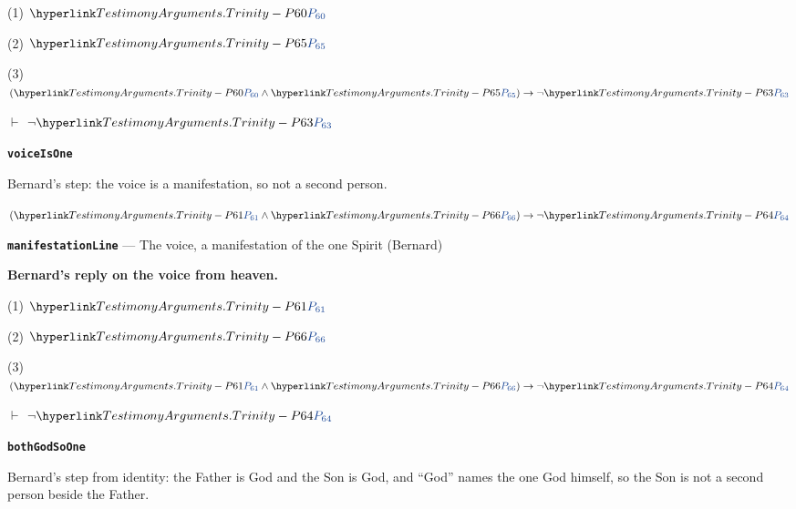 \documentclass[11pt,paper=\testimonypaper,DIV=13,parskip=false]{scrartcl}
\begin{document}
\begin{derivation}
  \item[(1)] \(\pvar{TestimonyArguments.Trinity}{60}\)
  \item[(2)] \(\pvar{TestimonyArguments.Trinity}{65}\)
  \item[(3)] \((\pvar{TestimonyArguments.Trinity}{60} \land \pvar{TestimonyArguments.Trinity}{65}) \rightarrow \lnot \pvar{TestimonyArguments.Trinity}{63}\)
  \item[\(\vdash\)] \(\lnot \pvar{TestimonyArguments.Trinity}{63}\)
\end{derivation}
\par\medskip\noindent\textbf{\texttt{voice\allowbreak{}Is\allowbreak{}One}}\par\nobreak\noindent
Bernard’s step: the voice is a manifestation, so not a second person.

\begin{derivation}
  \item[] \((\pvar{TestimonyArguments.Trinity}{61} \land \pvar{TestimonyArguments.Trinity}{66}) \rightarrow \lnot \pvar{TestimonyArguments.Trinity}{64}\)
\end{derivation}
\par\medskip\noindent\textbf{\texttt{manifestation\allowbreak{}Line}} --- The voice, a manifestation of the one Spirit (Bernard)\par\nobreak\noindent
\textbf{Bernard’s reply on the voice from heaven.}

\begin{derivation}
  \item[(1)] \(\pvar{TestimonyArguments.Trinity}{61}\)
  \item[(2)] \(\pvar{TestimonyArguments.Trinity}{66}\)
  \item[(3)] \((\pvar{TestimonyArguments.Trinity}{61} \land \pvar{TestimonyArguments.Trinity}{66}) \rightarrow \lnot \pvar{TestimonyArguments.Trinity}{64}\)
  \item[\(\vdash\)] \(\lnot \pvar{TestimonyArguments.Trinity}{64}\)
\end{derivation}
\par\medskip\noindent\textbf{\texttt{both\allowbreak{}God\allowbreak{}So\allowbreak{}One}}\par\nobreak\noindent
Bernard’s step from identity: the Father is God and the Son is God, and “God” names the one God himself, so the Son is not a second person beside the Father.
\end{document}
